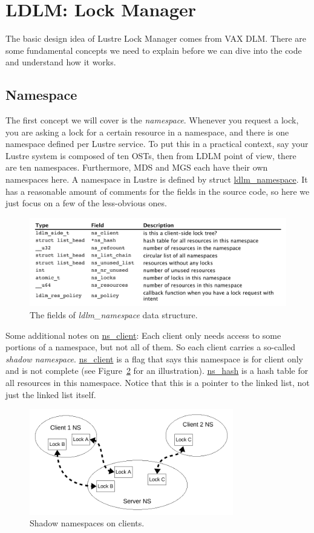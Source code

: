 \section{LDLM: Lock Manager}

The basic design idea of Lustre Lock Manager comes from VAX DLM. There
are some fundamental concepts we need to explain before we can dive into
the code and understand how it works.

\subsection{Namespace}

The first concept we will cover is the \textit{namespace}. Whenever you request a
lock, you are asking a lock for a certain resource in a namespace, and there is
one namespace defined per Lustre service.  To put this in a practical context,
say your Lustre system is composed of ten OSTs, then from LDLM point of view,
there are ten namespaces.  Furthermore, MDS and MGS each have their own
namespaces here. A namespace in Lustre is defined by struct
\url{ldlm_namespace}. It has a reasonable amount of comments for the fields in the
source code, so here we just focus on a few of the less-obvious ones.

\begin{figure}[htb]
\centering
\includegraphics[width=5in]{img/lustre_ns}
\caption{The fields of \textit{ldlm\_namespace} data structure.}
\label{fig:ns}
\end{figure}

Some additional notes on \url{ns_client}: Each client only needs access to
some portions of a namespace, but not all of them. So each client carries a
so-called \textit{shadow namespace}.  \url{ns_client} is a flag that says this
namespace is for client only and is not complete (see Figure~\ref{fig:shadow} for an
illustration). \url{ns_hash} is a hash table for all resources in this
namespace. Notice that this is a pointer to the linked list, not just the
linked list itself.

\begin{figure}[htb]
\centering
\includegraphics[width=3.5in]{img/lustre_nsclient}
\caption{Shadow namespaces on clients.}
\label{fig:shadow}
\end{figure}

